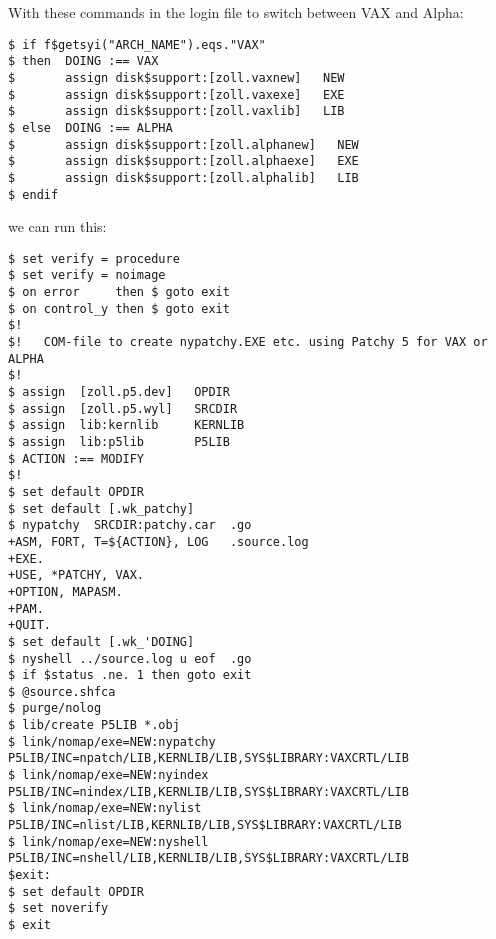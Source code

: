 \begin{enumerate}
With these commands in the login file  to switch between
VAX and Alpha:
\begin{verbatim}
$ if f$getsyi("ARCH_NAME").eqs."VAX"
$ then  DOING :== VAX
$       assign disk$support:[zoll.vaxnew]   NEW
$       assign disk$support:[zoll.vaxexe]   EXE
$       assign disk$support:[zoll.vaxlib]   LIB
$ else  DOING :== ALPHA
$       assign disk$support:[zoll.alphanew]   NEW
$       assign disk$support:[zoll.alphaexe]   EXE
$       assign disk$support:[zoll.alphalib]   LIB
$ endif
\end{verbatim}
we can run this:
\begin{verbatim}
$ set verify = procedure
$ set verify = noimage
$ on error     then $ goto exit
$ on control_y then $ goto exit
$!
$!   COM-file to create nypatchy.EXE etc. using Patchy 5 for VAX or ALPHA
$!
$ assign  [zoll.p5.dev]   OPDIR
$ assign  [zoll.p5.wyl]   SRCDIR
$ assign  lib:kernlib     KERNLIB
$ assign  lib:p5lib       P5LIB
$ ACTION :== MODIFY
$!
$ set default OPDIR
$ set default [.wk_patchy]
$ nypatchy  SRCDIR:patchy.car  .go
+ASM, FORT, T=${ACTION}, LOG   .source.log
+EXE.
+USE, *PATCHY, VAX.
+OPTION, MAPASM.
+PAM.
+QUIT.
$ set default [.wk_'DOING]
$ nyshell ../source.log u eof  .go
$ if $status .ne. 1 then goto exit
$ @source.shfca
$ purge/nolog
$ lib/create P5LIB *.obj
$ link/nomap/exe=NEW:nypatchy  P5LIB/INC=npatch/LIB,KERNLIB/LIB,SYS$LIBRARY:VAXCRTL/LIB
$ link/nomap/exe=NEW:nyindex   P5LIB/INC=nindex/LIB,KERNLIB/LIB,SYS$LIBRARY:VAXCRTL/LIB
$ link/nomap/exe=NEW:nylist    P5LIB/INC=nlist/LIB,KERNLIB/LIB,SYS$LIBRARY:VAXCRTL/LIB
$ link/nomap/exe=NEW:nyshell   P5LIB/INC=nshell/LIB,KERNLIB/LIB,SYS$LIBRARY:VAXCRTL/LIB
$exit:
$ set default OPDIR
$ set noverify
$ exit
\end{verbatim}
\end{enumerate}

